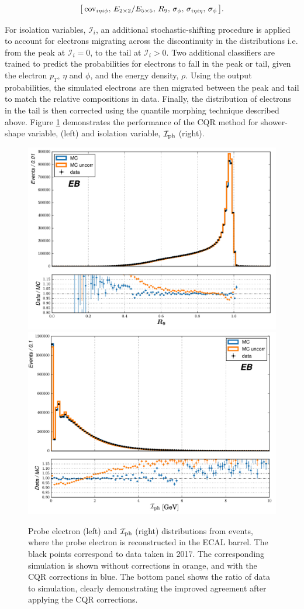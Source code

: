 \begin{equation}
    \big[\,{\rm{cov}}_{i\eta i\phi},\, E_{2\times2}/E_{5\times5},\, R_9,\, \sigma_{\phi},\, \sigma_{i\eta i\eta},\, \sigma_\phi\,\big].
\end{equation}

For isolation variables, $\mathcal{I}_i$, an additional stochastic-shifting procedure is applied to account for electrons migrating across the discontinuity in the distributions i.e. from the peak at $\mathcal{I}_i=0$, to the tail at $\mathcal{I}_i>0$. Two additional classifiers are trained to predict the probabilities for electrons to fall in the peak or tail, given the electron $p_T$, $\eta$ and $\phi$, and the energy density, $\rho$. Using the output probabilities, the simulated electrons are then migrated between the peak and tail to match the relative compositions in data. Finally, the distribution of electrons in the tail is then corrected using the quantile morphing technique described above. Figure \ref{fig:photon_id_0} demonstrates the performance of the CQR method for shower-shape variable, \RNINE (left) and isolation variable, $\mathcal{I}_{\rm{ph}}$ (right).

\begin{figure}
  \centering
  \includegraphics[width=.49\textwidth]{Figures/hgg_overview/dataMC_probeR9_0_corr.pdf}
  \includegraphics[width=.49\textwidth]{Figures/hgg_overview/dataMC_probePhoIso_0_corr.pdf}
  \caption[Corrections from the chained quantile regression method for \RNINE and $\mathcal{I}_{\rm{ph}}$]
  {
    Probe electron \RNINE (left) and $\mathcal{I}_{\rm{ph}}$ (right) distributions from \Zee events, where the probe electron is reconstructed in the ECAL barrel. The black points correspond to data taken in 2017. The corresponding simulation is shown without corrections in orange, and with the CQR corrections in blue. The bottom panel shows the ratio of data to simulation, clearly demonstrating the improved agreement after applying the CQR corrections.
  }
  \label{fig:photon_id_0}
\end{figure}

